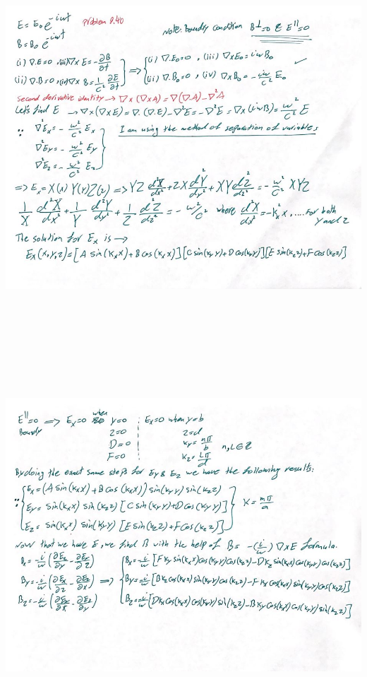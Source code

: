 \documentclass[fleqn]{article}
\begin{document}
\begin{enumerate}
    \begin{center}
      \includegraphics[height=14cm, width=16cm]{1.JPG}
    \end{center}

    \pagebreak

    \begin{center}
      \includegraphics[height=14cm, width=16cm]{2.JPG}
    \end{center}


\end{enumerate}
\end{document}
